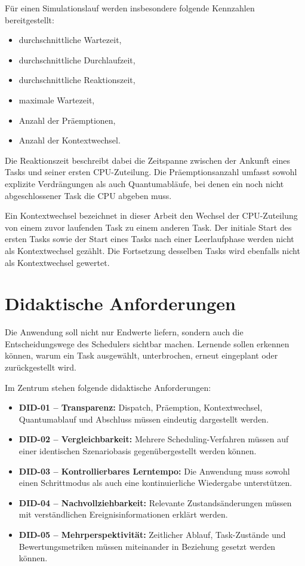 Für einen Simulationslauf werden insbesondere folgende Kennzahlen bereitgestellt:

\begin{itemize}
    \item durchschnittliche Wartezeit,
    \item durchschnittliche Durchlaufzeit,
    \item durchschnittliche Reaktionszeit,
    \item maximale Wartezeit,
    \item Anzahl der Präemptionen,
    \item Anzahl der Kontextwechsel.
\end{itemize}

Die Reaktionszeit beschreibt dabei die Zeitspanne zwischen der Ankunft eines Tasks und seiner ersten CPU-Zuteilung. Die Präemptionsanzahl umfasst sowohl explizite Verdrängungen als auch Quantumabläufe, bei denen ein noch nicht abgeschlossener Task die CPU abgeben muss.

Ein Kontextwechsel bezeichnet in dieser Arbeit den Wechsel der CPU-Zuteilung von einem zuvor laufenden Task zu einem anderen Task. Der initiale Start des ersten Tasks sowie der Start eines Tasks nach einer Leerlaufphase werden nicht als Kontextwechsel gezählt. Die Fortsetzung desselben Tasks wird ebenfalls nicht als Kontextwechsel gewertet.

\section{Didaktische Anforderungen}

Die Anwendung soll nicht nur Endwerte liefern, sondern auch die Entscheidungswege des Schedulers sichtbar machen. Lernende sollen erkennen können, warum ein Task ausgewählt, unterbrochen, erneut eingeplant oder zurückgestellt wird.

Im Zentrum stehen folgende didaktische Anforderungen:

\begin{itemize}
    \item \textbf{DID-01 -- Transparenz:} Dispatch, Präemption, Kontextwechsel, Quantumablauf und Abschluss müssen eindeutig dargestellt werden.
    \item \textbf{DID-02 -- Vergleichbarkeit:} Mehrere Scheduling-Verfahren müssen auf einer identischen Szenariobasis gegenübergestellt werden können.
    \item \textbf{DID-03 -- Kontrollierbares Lerntempo:} Die Anwendung muss sowohl einen Schrittmodus als auch eine kontinuierliche Wiedergabe unterstützen.
    \item \textbf{DID-04 -- Nachvollziehbarkeit:} Relevante Zustandsänderungen müssen mit verständlichen Ereignisinformationen erklärt werden.
    \item \textbf{DID-05 -- Mehrperspektivität:} Zeitlicher Ablauf, Task-Zustände und Bewertungsmetriken müssen miteinander in Beziehung gesetzt werden können.
\end{itemize}

